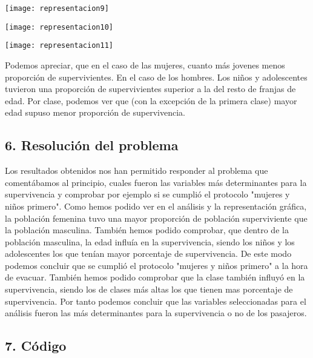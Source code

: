 \documentclass[12pt]{article}
\begin{document}
\label{imagen}
  	\begin{center}
  	\texttt{[image: representacion9]}
\end{center}
\label{imagen}
  	\begin{center}
  	\texttt{[image: representacion10]}
\end{center}
\label{imagen}
  	\begin{center}
  	\texttt{[image: representacion11]}
\end{center}

Podemos apreciar, que en el caso de las mujeres, cuanto más jovenes menos proporción de supervivientes. En el caso de los hombres. Los niños y adolescentes tuvieron una proporción de supervivientes superior a la del resto de franjas de edad.
Por clase, podemos ver que (con la excepción de la primera clase) mayor edad supuso menor proporción de supervivencia.

\hypertarget{resolucion}{%
\subsection{6. Resolución del problema}\label{resolucion}}

Los resultados obtenidos nos han permitido responder al problema que comentábamos al principio, cuales fueron las variables más determinantes para la supervivencia y comprobar por ejemplo si se cumplió el protocolo "mujeres y niños primero". Como hemos podido ver en el análisis y la representación gráfica, la población femenina tuvo una mayor proporción de población superviviente que la población masculina. También hemos podido comprobar, que dentro de la población masculina, la edad influía en la supervivencia, siendo los niños y los adolescentes los que tenían mayor porcentaje de supervivencia. De este modo podemos concluir que se cumplió el protocolo "mujeres y niños primero" a la hora de evacuar.
También hemos podido comprobar que la clase también influyó en la supervivencia, siendo los de clases más altas los que tienen mas porcentaje de supervivencia. Por tanto podemos concluir que las variables seleccionadas para el análisis fueron las más determinantes para la supervivencia o no de los pasajeros.


\hypertarget{codigo}{%
\subsection{7. Código}\label{codigo}}
\end{document}
